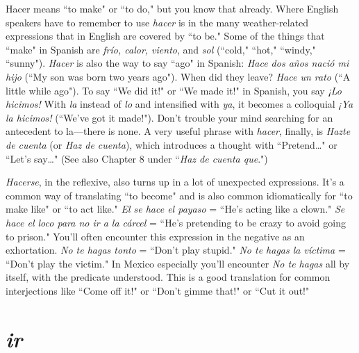 Hacer means ``to make" or ``to do," but you know that already.
Where English speakers have to remember to use \emph{hacer} is in the many
weather-related expressions that in English are covered by ``to be."
Some of the things that ``make" in Spanish are \emph{frío, calor, viento}, and
\emph{sol} (``cold," ``hot," ``windy," ``sunny"). \emph{Hacer} is also the way to say
``ago" in Spanish: \emph{Hace dos años nació mi hijo} (``My son was born two
years ago"). When did they leave? \emph{Hace un rato} (``A little while ago").
To say ``We did it!" or ``We made it!" in Spanish, you say \emph{¡Lo hicimos!}
With \emph{la} instead of \emph{lo} and intensified with \emph{ya}, it becomes a colloquial
\emph{¡Ya la hicimos!} (``We've got it made!"). Don't trouble your mind
searching for an antecedent to la---there is none. A very useful phrase
with \emph{hacer}, finally, is \emph{Hazte de cuenta} (or \emph{Haz de cuenta}), which introduces a thought with ``Pretend\ldots{}" or ``Let's say\ldots{}" (See also
Chapter 8 under ``\emph{Haz de cuenta que}.")

\emph{Hacerse}, in the reflexive, also turns up in a lot of unexpected
expressions. It's a common way of translating ``to become" and is also
common idiomatically for ``to make like" or ``to act like." \emph{El se hace el
payaso} = ``He's acting like a clown." \emph{Se hace el loco para no ir a la
cárcel} = ``He's pretending to be crazy to avoid going to prison." You'll
often encounter this expression in the negative as an exhortation.
\emph{No te hagas tonto} = ``Don't play stupid." \emph{No te hagas la víctima} =
``Don't play the victim." In Mexico especially you'll encounter \emph{No te
hagas} all by itself, with the predicate understood. This is a good translation for common interjections like ``Come off it!" or ``Don't gimme
that!" or ``Cut it out!"

\section{\emph{ir}}

